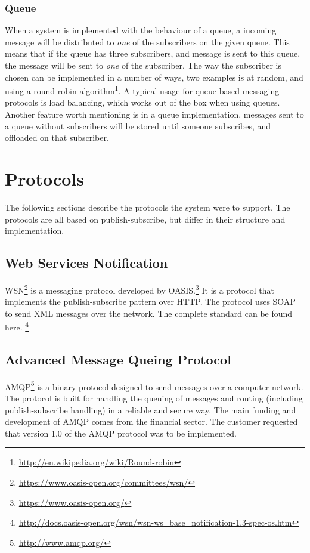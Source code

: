\subsubsection{Queue}
When a system is implemented with the behaviour of a queue, a incoming message will be distributed to \textit{one} of the subscribers on the given queue. This means that if the queue has three subscribers, and message is sent to this queue, the message will be sent to \textit{one} of the subscriber. The way the subscriber is chosen can be implemented in a number of ways, two examples is at random, and using a round-robin algorithm\footnote{\url{http://en.wikipedia.org/wiki/Round-robin}}. A typical usage for queue based messaging  protocols is load balancing, which works out of the box when using queues. Another feature worth mentioning is in a queue implementation, messages sent to a queue without subscribers will be stored until someone subscribes, and offloaded on that subscriber.

\section{Protocols}
\label{prestudies-protocols}

The following sections describe the protocols the system were to support. The protocols are all based on publish-subscribe, but differ in their structure and implementation.

\subsection{Web Services Notification}
\label{subsec:prestudies-wsnotification}

WSN\footnote{\url{https://www.oasis-open.org/committees/wsn/}} is a messaging protocol developed by OASIS.\footnote{\url{https://www.oasis-open.org/}} It is a protocol that implements the publish-subscribe pattern over HTTP. The protocol uses SOAP to send XML messages over the network. The complete standard can be found here. \footnote{\url{http://docs.oasis-open.org/wsn/wsn-ws_base_notification-1.3-spec-os.htm}}

\subsection{Advanced Message Queing Protocol}
\label{subsec:prestudies-amqp}
AMQP\footnote{\url{http://www.amqp.org/}} is a binary protocol designed to send messages over a computer network. The protocol is built for handling the queuing of messages and routing (including publish-subscribe handling) in a reliable and secure way. The main funding and development of AMQP comes from the financial sector. The customer requested that version 1.0 of the AMQP protocol was to be implemented.


